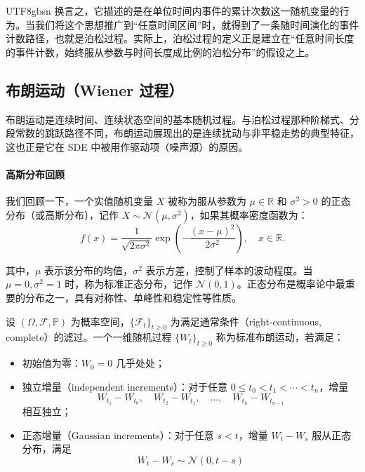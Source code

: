 \documentclass{article}
\begin{document}
\begin{CJK*}{UTF8}{gbsn}
换言之，它描述的是在单位时间内事件的累计次数这一随机变量的行为。当我们将这个思想推广到“任意时间区间”时，就得到了一条随时间演化的事件计数路径，也就是泊松过程。实际上，泊松过程的定义正是建立在“任意时间长度的事件计数，始终服从参数与时间长度成比例的泊松分布”的假设之上。

\subsection{布朗运动（Wiener 过程）}

布朗运动是连续时间、连续状态空间的基本随机过程。与泊松过程那种阶梯式、分段常数的跳跃路径不同，布朗运动展现出的是连续扰动与非平稳走势的典型特征，这也正是它在 SDE 中被用作驱动项（噪声源）的原因。

\paragraph{高斯分布回顾}

我们回顾一下，一个实值随机变量 $X$ 被称为服从参数为 $\mu \in \mathbb{R}$ 和 $\sigma^2 > 0$ 的正态分布（或高斯分布），记作 $X \sim \mathcal{N}(\mu, \sigma^2)$，如果其概率密度函数为：
\[
f(x) = \frac{1}{\sqrt{2\pi \sigma^2}} \exp\left( -\frac{(x - \mu)^2}{2\sigma^2} \right), \quad x \in \mathbb{R}.
\]

其中，$\mu$ 表示该分布的均值，$\sigma^2$ 表示方差，控制了样本的波动程度。当 $\mu = 0, \sigma^2 = 1$ 时，称为标准正态分布，记作 $\mathcal{N}(0, 1)$。正态分布是概率论中最重要的分布之一，具有对称性、单峰性和稳定性等性质。

\begin{definition}[布朗运动]
设 $(\Omega, \mathcal{F}, \mathbb{P})$ 为概率空间，$\{\mathcal{F}_t\}_{t \geq 0}$ 为满足通常条件（right-continuous, complete）的滤过。一个一维随机过程 $\{W_t\}_{t \geq 0}$ 称为标准布朗运动，若满足：

\begin{itemize}
    \item 初始值为零：$W_0 = 0$ 几乎处处；
    
    \item 独立增量（independent increments）：对于任意 $0 \leq t_0 < t_1 < \cdots < t_n$，增量
    \[
    W_{t_1} - W_{t_0},\quad W_{t_2} - W_{t_1},\quad \dots,\quad W_{t_n} - W_{t_{n-1}}
    \]
    相互独立；
    
    \item 正态增量（Gaussian increments）：对于任意 $s < t$，增量 $W_t - W_s$ 服从正态分布，满足
    \[
    W_t - W_s \sim \mathcal{N}(0, t - s)
    \]
    

\end{itemize}
\end{definition}
\end{CJK*}
\end{document}
